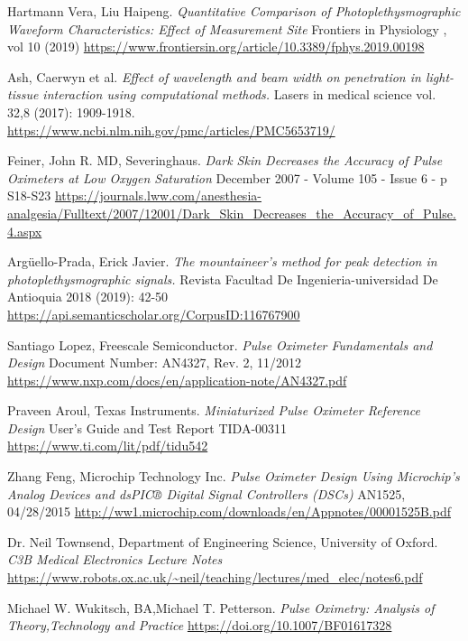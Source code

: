 \documentclass[10pt,a4paper]{article}
\begin{document}
	
	\begin{thebibliography}{10}		
		
		
		Hartmann Vera, Liu Haipeng.
		\textit{Quantitative Comparison of Photoplethysmographic 
		Waveform Characteristics: Effect of Measurement Site}
		Frontiers in Physiology , vol 10 (2019)
		\url{https://www.frontiersin.org/article/10.3389/fphys.2019.00198}

		Ash, Caerwyn et al.
		\textit{Effect of wavelength and beam width on 
		penetration in light-tissue interaction using computational methods.}
		Lasers in medical science vol. 32,8 (2017): 1909-1918.
		\url{https://www.ncbi.nlm.nih.gov/pmc/articles/PMC5653719/}		
		
		Feiner, John R. MD, Severinghaus.
		\textit{Dark Skin Decreases the Accuracy of Pulse Oximeters at 
		Low Oxygen Saturation}
		December 2007 - Volume 105 - Issue 6 - p S18-S23
		\url{https://journals.lww.com/anesthesia-analgesia/Fulltext/2007/12001/Dark_Skin_Decreases_the_Accuracy_of_Pulse.4.aspx}		
		
		Argüello-Prada, Erick Javier. 
		\textit{The mountaineer's method for peak detection in photoplethysmographic signals.} 
		Revista Facultad De Ingenieria-universidad De Antioquia 2018 (2019): 42-50
		\url{https://api.semanticscholar.org/CorpusID:116767900}
		 
		Santiago Lopez, Freescale Semiconductor.
		\textit{Pulse Oximeter Fundamentals and Design} 
		Document Number: AN4327, Rev. 2, 11/2012
		\url{https://www.nxp.com/docs/en/application-note/AN4327.pdf}
		
		Praveen Aroul, Texas Instruments.
		\textit{Miniaturized Pulse Oximeter Reference Design}
		User’s Guide and Test Report TIDA-00311
		\url{https://www.ti.com/lit/pdf/tidu542}
		
		Zhang Feng, Microchip Technology Inc.
		\textit{Pulse Oximeter Design Using Microchip’s Analog Devices
		and dsPIC® Digital Signal Controllers (DSCs)}
		AN1525,   04/28/2015
		\url{http://ww1.microchip.com/downloads/en/Appnotes/00001525B.pdf}

		Dr. Neil Townsend, Department of Engineering Science, University of Oxford.
		\textit{C3B Medical Electronics Lecture Notes}
		\url{https://www.robots.ox.ac.uk/~neil/teaching/lectures/med_elec/notes6.pdf}	

		Michael W. Wukitsch, BA,Michael T. Petterson.
		\textit{Pulse Oximetry: Analysis of Theory,Technology and Practice}
		\url{https://doi.org/10.1007/BF01617328}	
	\end{thebibliography}
\end{document}
